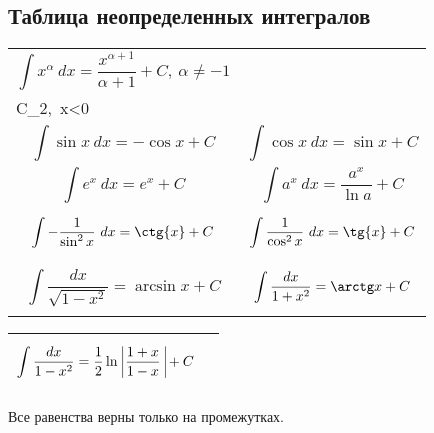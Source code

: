 \subsection{Таблица неопределенных интегралов}
    \begin{tabular}{p{8cm}|p{}}
        \toprule
        \[\int x^\alpha\ dx = \frac{x^{\alpha + 1}}{\alpha + 1} + C, \ \alpha \neq -1\] & \[\int\frac{dx}{x} = ln|x| + \begin{cases}C_1,\ x>0\\C_2,\ x<0\end{cases}\] \\
        \midrule
        \[\int \sin{x}\ dx = -\cos{x}+C\] & \[\int \cos{x}\ dx = \sin{x} + C\] \\
        \midrule
        \[\int e^x\ dx = e^x+C\] & \[\int a^x\ dx = \frac{a^x}{\ln{a}}+C\]\\
        \midrule
        \[\int -\frac{1}{\sin^2{x}}\ dx=\ctg{x}+C\] & \[\int \frac{1}{\cos^2{x}}\ dx=\tg{x}+C\] \\
        \midrule
        \[\int\frac{dx}{\sqrt{1 - x^2}} = \arcsin x + C\] & \[\int\frac{dx}{1 + x^2} = \arctg x + C\] \\
        \bottomrule
    \end{tabular}
    \newpage
    \begin{tabular}{p{7.5cm}|p{}}
        \toprule
        \[\int\frac{dx}{1 - x^2} = \frac{1}{2}\ln\ \vline\frac{1+x}{1-x}\ \vline + C\] & \null \\
        \bottomrule
    \end{tabular}
\begin{comm}
    Все равенства верны только на промежутках.
\end{comm} 

